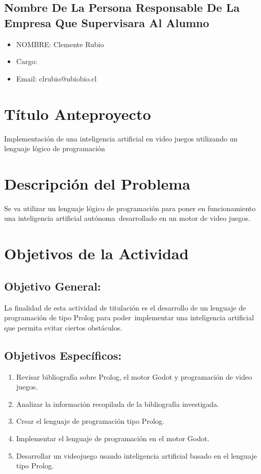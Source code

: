 \documentclass[spanish]{article}
\begin{document}
\subsection{Nombre De La Persona Responsable De La Empresa Que Supervisara Al Alumno}
	\begin{itemize}
		\item NOMBRE: Clemente Rubio
		\item Cargo:
		\item Email: clrubio@ubiobio.cl
	\end{itemize}

\section{Título Anteproyecto}

Implementación de una inteligencia artificial en video juegos utilizando un lenguaje lógico de programación

\section{Descripción del Problema}

Se va utilizar un lenguaje lógico de programación para poner en funcionamiento una inteligencia artificial autónoma\
desarrollado en un motor de video juegos.

\section{Objetivos de la Actividad}
\subsection{Objetivo General:}

La finalidad de esta actividad de titulación es el desarrollo de un lenguaje de programación de tipo Prolog para poder\
implementar una inteligencia artificial que permita evitar ciertos obstáculos.

\subsection{Objetivos Específicos:}

\begin{enumerate}
    \item Revisar bibliografía sobre Prolog, el motor Godot y programación de video juegos.
    \item Analizar la información recopilada de la bibliografía investigada.
    \item Crear el lenguaje de programación tipo Prolog.
    \item Implementar el lenguaje de programación en el motor Godot.
    \item Desarrollar un videojuego usando inteligencia artificial basado en el lenguaje tipo Prolog.
\end{enumerate}
\end{document}
